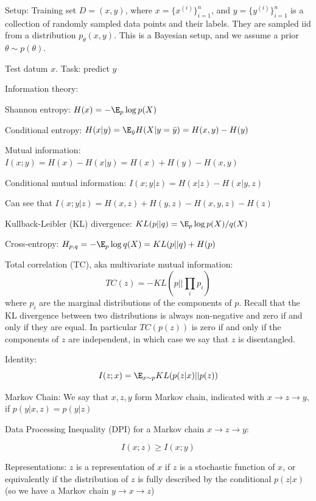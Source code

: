 \documentclass[english]{article}
\begin{document}
\item Setup: Training set $D = (x,y)$, where $x = \{x^{(i)}\}_{i=1}^n$, and $y = \{y^{(i)}\}_{i=1}^n$ is a collection of randomly sampled data points and their labels. They are sampled iid from a distribution $p_\theta(x,y)$. This is a Bayesian setup, and we assume a prior $\theta\sim p(\theta)$.

Test datum $x$. Task: predict $y$

\item Information theory: 

\benum 
\item Shannon entropy: $H(x)= -\E_p \log p(X)$
\item Conditional entropy: $H(x|y)= \E_{\bar y} H(X|y=\bar y) = H(x,y)-H(y)$
\item Mutual information: $I(x;y) = H(x)- H(x|y)  = H(x)+H(y)-H(x,y)$
\item Conditional mutual information: $I(x;y|z)=H(x|z)-H(x|y,z)$

Can see that $I(x;y|z) = H(x,z)+H(y,z)-H(x,y,z)- H(z)$

\item Kullback-Leibler (KL) divergence: $KL(p||q)=\E_p \log p(X)/q(X)$
\item Cross-entropy: $H_{p,q}=-\E_p \log q(X) = KL(p||q)+H(p)$
\item Total correlation (TC), aka multivariate mutual information: 
$$TC(z)=-KL(p || \prod_i p_i)$$ 
where $p_i$  are the marginal distributions of the components of $p$.  Recall that the KL divergence between two distributions is always non-negative and zero if and only if they are equal. In particular $TC(p(z))$ is zero if and only if the components of $z$ are independent, in which case we say that $z$ is disentangled.
\item Identity: 
$$I(z;x)= \E_{x\sim p} KL(p(z|x)||p(z))$$

\item Markov Chain: We say that $x,z,y$ form Markov chain, indicated with $x \to z \to y$, if $p(y|x,z) = p(y|z)$
\item Data Processing Inequality (DPI) for a Markov chain $x \to z \to y$:

$$I(x;z) \ge I(x;y)$$

\eenum 


\item 
 Representations: $z$ is a representation of $x$ if $z$ is a stochastic function of $x$, or equivalently if the distribution of $z$ is fully described by the conditional $p(z|x)$ (so we have a Markov chain $y\to x\to z$)
\end{document}
